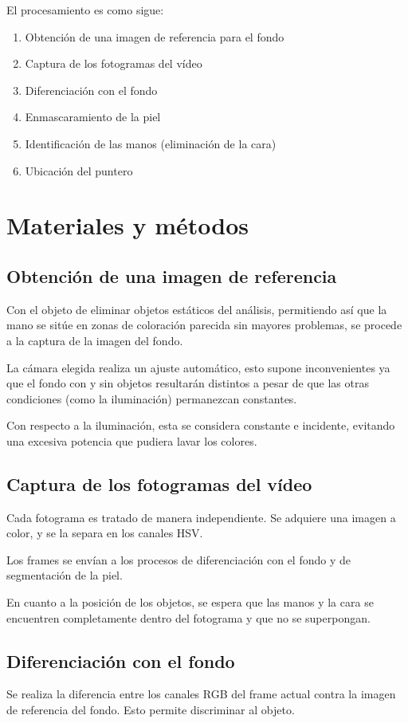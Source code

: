 \documentclass[conference,a4paper,10pt,oneside,final]{tfmpd}
\begin{document}
   	 El procesamiento es como sigue:
   	 \begin{enumerate}
   		 \item Obtención de una imagen de referencia para el fondo
   		 \item Captura de los fotogramas del vídeo
   		 \item Diferenciación con el fondo
   		 \item Enmascaramiento de la piel
   		 \item Identificación de las manos (eliminación de la cara)
   		 \item Ubicación del puntero
   	 \end{enumerate}

    \section{Materiales y métodos}
   	 \subsection{Obtención de una imagen de referencia}
		Con el objeto de eliminar objetos estáticos del análisis, 
   		 permitiendo así que la mano se sitúe en zonas de coloración parecida
   		 sin mayores problemas, 
se procede a la captura de la imagen del fondo.
		
		La cámara elegida realiza un ajuste automático, esto supone inconvenientes ya que el fondo con y sin objetos resultarán distintos a pesar 
	de que las otras condiciones (como la iluminación) permanezcan constantes.

   		 Con respecto a la iluminación, esta se considera constante e incidente,
   		 evitando una excesiva potencia que pudiera lavar los colores.

   	 \subsection{Captura de los fotogramas del vídeo}
   		 Cada fotograma es tratado de manera independiente.
   		 Se adquiere una imagen a color, y se la separa en los canales HSV.
		
		Los frames se envían a los procesos de diferenciación con el fondo 
		y de segmentación de la piel.

En cuanto a la posición de los objetos, se espera que las manos y la cara se encuentren completamente dentro del fotograma y que no se superpongan.

   	 \subsection{Diferenciación con el fondo}
		Se realiza la diferencia entre los canales RGB del frame actual contra
		la imagen de referencia del fondo.
		Esto permite discriminar al objeto.
\end{document}

